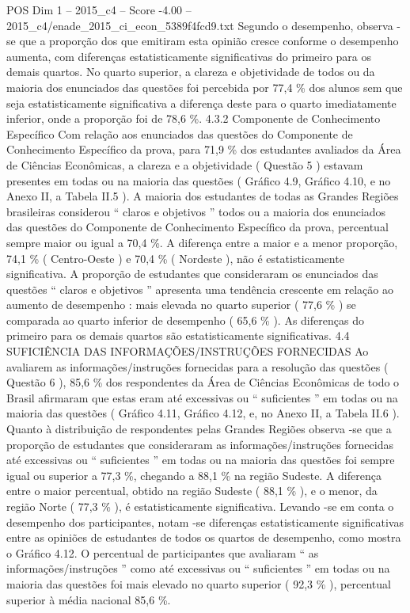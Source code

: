 \begin{textsample}{POS Dim 1 – 2015\_c4 – Score -4.00 – 2015\_c4/enade\_2015\_ci\_econ\_5389f4fcd9.txt}
Segundo o desempenho, observa -se que a proporção dos que emitiram esta opinião cresce conforme o desempenho aumenta, com diferenças estatisticamente significativas do primeiro para os demais quartos.
No quarto superior, a clareza e objetividade de todos ou da maioria dos enunciados das questões foi percebida por 77,4 \% dos alunos sem que seja estatisticamente significativa a diferença deste para o quarto imediatamente inferior, onde a proporção foi de 78,6 \%. 4.3.2 Componente de Conhecimento Específico Com relação aos enunciados das questões do Componente de Conhecimento Específico da prova, para 71,9 \% dos estudantes avaliados da Área de Ciências Econômicas, a clareza e a objetividade ( Questão 5 ) estavam presentes em todas ou na maioria das questões ( Gráfico 4.9, Gráfico 4.10, e no Anexo II, a Tabela II.5 ).
A maioria dos estudantes de todas as Grandes Regiões brasileiras considerou “ claros e objetivos ” todos ou a maioria dos enunciados das questões do Componente de Conhecimento Específico da prova, percentual sempre maior ou igual a 70,4 \%.
A diferença entre a maior e a menor proporção, 74,1 \% ( Centro-Oeste ) e 70,4 \% ( Nordeste ), não é estatisticamente significativa.
A proporção de estudantes que consideraram os enunciados das questões “ claros e objetivos ” apresenta uma tendência crescente em relação ao aumento de desempenho : mais elevada no quarto superior ( 77,6 \% ) se comparada ao quarto inferior de desempenho ( 65,6 \% ).
As diferenças do primeiro para os demais quartos são estatisticamente significativas. 4.4 SUFICIÊNCIA DAS INFORMAÇÕES/INSTRUÇÕES FORNECIDAS Ao avaliarem as informações/instruções fornecidas para a resolução das questões ( Questão 6 ), 85,6 \% dos respondentes da Área de Ciências Econômicas de todo o Brasil afirmaram que estas eram até excessivas ou “ suficientes ” em todas ou na maioria das questões ( Gráfico 4.11, Gráfico 4.12, e, no Anexo II, a Tabela II.6 ).
Quanto à distribuição de respondentes pelas Grandes Regiões observa -se que a proporção de estudantes que consideraram as informações/instruções fornecidas até excessivas ou “ suficientes ” em todas ou na maioria das questões foi sempre igual ou superior a 77,3 \%, chegando a 88,1 \% na região Sudeste.
A diferença entre o maior percentual, obtido na região Sudeste ( 88,1 \% ), e o menor, da região Norte ( 77,3 \% ), é estatisticamente significativa.
Levando -se em conta o desempenho dos participantes, notam -se diferenças estatisticamente significativas entre as opiniões de estudantes de todos os quartos de desempenho, como mostra o Gráfico 4.12.
O percentual de participantes que avaliaram “ as informações/instruções ” como até excessivas ou “ suficientes ” em todas ou na maioria das questões foi mais elevado no quarto superior ( 92,3 \% ), percentual superior à média nacional 85,6 \%.

\end{textsample}
